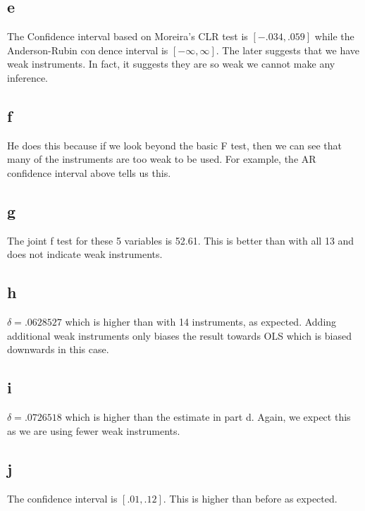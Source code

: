 \documentclass[11pt]{article}
\begin{document}
 \subsection{e}
 The Confidence interval based on Moreira's CLR test is $[ -.034,    .059]$ while the Anderson-Rubin condence interval is $ [-\infty, \infty] $. The later suggests that we have weak instruments. In fact, it suggests they are so weak we cannot make any inference. 
 
  \subsection{f}
  He does this because if we look beyond the basic F test, then we can see that many of the instruments are too weak to be used. For example, the AR confidence interval above tells us this. 
  
  \subsection{g}
  The joint f test for these 5 variables is  52.61. This is better than with all 13 and does not indicate weak instruments.
  
  \subsection{h}
  $\delta = .0628527 $ which is higher than with 14 instruments, as expected. Adding additional weak instruments only biases the result towards OLS which is biased downwards in this case. 
  
  \subsection{i}
  $\delta = .0726518 $ which is higher than the estimate in part d. Again, we expect this as we are using fewer weak instruments. 
  \subsection{j}
  The confidence interval is $ [ .01, .12]$. This is higher than before as expected. 
\end{document}

